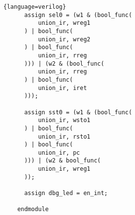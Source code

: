 \begin{lstlisting}{language=verilog}
      assign sel0 = (w1 & (bool_func(
          union_ir, wreg1
      ) | bool_func(
          union_ir, wreg2
      ) | bool_func(
          union_ir, rreg
      ))) | (w2 & (bool_func(
          union_ir, rreg
      ) | bool_func(
          union_ir, iret
      )));
    
      assign sst0 = (w1 & (bool_func(
          union_ir, wsto1
      ) | bool_func(
          union_ir, rsto1
      ) | bool_func(
          union_ir, pc
      ))) | (w2 & bool_func(
          union_ir, wreg1
      ));
    
      assign dbg_led = en_int;
    
    endmodule
\end{lstlisting}